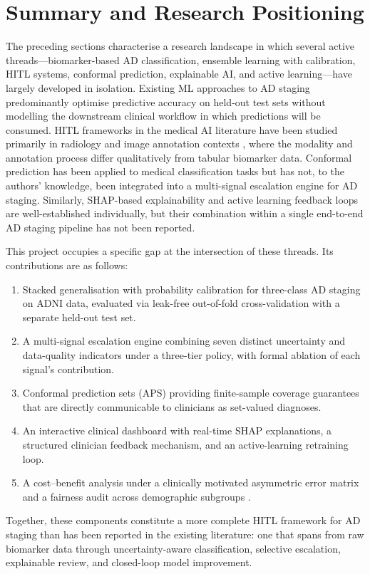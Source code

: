 \section{Summary and Research Positioning}
\label{sec:positioning}

The preceding sections characterise a research landscape in which several
active threads---biomarker-based AD classification, ensemble learning with
calibration, HITL systems, conformal prediction, explainable AI, and active
learning---have largely developed in isolation. Existing ML approaches to AD
staging predominantly optimise predictive accuracy on held-out test sets without
modelling the downstream clinical workflow in which predictions will be consumed.
HITL frameworks in the medical AI literature have been studied primarily in
radiology and image annotation contexts \citep{rajpurkar2022ai}, where the
modality and annotation process differ qualitatively from tabular biomarker data.
Conformal prediction has been applied to medical classification tasks but has
not, to the authors' knowledge, been integrated into a multi-signal escalation
engine for AD staging. Similarly, SHAP-based explainability and active learning
feedback loops are well-established individually, but their combination within a
single end-to-end AD staging pipeline has not been reported.

This project occupies a specific gap at the intersection of these threads. Its
contributions are as follows:

\begin{enumerate}[nosep]
  \item Stacked generalisation with probability calibration for three-class AD
    staging on ADNI data, evaluated via leak-free out-of-fold cross-validation
    with a separate held-out test set.
  \item A multi-signal escalation engine combining seven distinct uncertainty and
    data-quality indicators under a three-tier policy, with formal ablation of
    each signal's contribution.
  \item Conformal prediction sets (APS) providing finite-sample coverage
    guarantees that are directly communicable to clinicians as set-valued
    diagnoses.
  \item An interactive clinical dashboard with real-time SHAP explanations, a
    structured clinician feedback mechanism, and an active-learning retraining
    loop.
  \item A cost--benefit analysis under a clinically motivated asymmetric error
    matrix and a fairness audit across demographic subgroups
    \citep{mehrabi2021survey}.
\end{enumerate}

Together, these components constitute a more complete HITL framework for AD
staging than has been reported in the existing literature: one that spans from
raw biomarker data through uncertainty-aware classification, selective
escalation, explainable review, and closed-loop model improvement.

